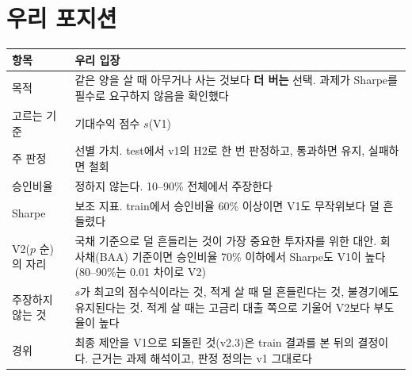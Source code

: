 \section{우리 포지션}
\begin{table}[H]\centering\small
\begin{tabularx}{\linewidth}{@{}p{30mm}L@{}}\toprule
항목 & 우리 입장\\\midrule
목적 & 같은 양을 살 때 아무거나 사는 것보다 \textbf{더 버는} 선택. 과제가 Sharpe를 필수로 요구하지 않음을 확인했다\\
고르는 기준 & 기대수익 점수 $s$(V1)\\
주 판정 & 선별 가치. test에서 v1의 H2로 한 번 판정하고, 통과하면 유지, 실패하면 철회\\
승인비율 & 정하지 않는다. 10--90\% 전체에서 주장한다\\
Sharpe & 보조 지표. train에서 승인비율 60\% 이상이면 V1도 무작위보다 덜 흔들렸다\\
V2($p$ 순)의 자리 & 국채 기준으로 덜 흔들리는 것이 가장 중요한 투자자를 위한 대안. 회사채(BAA) 기준이면 승인비율 70\% 이하에서 Sharpe도 V1이 높다(80--90\%는 0.01 차이로 V2)\\
주장하지 않는 것 & $s$가 최고의 점수식이라는 것, 적게 살 때 덜 흔들린다는 것, 불경기에도 유지된다는 것. 적게 살 때는 고금리 대출 쪽으로 기울어 V2보다 부도율이 높다\\
경위 & 최종 제안을 V1으로 되돌린 것(v2.3)은 train 결과를 본 뒤의 결정이다. 근거는 과제 해석이고, 판정 정의는 v1 그대로다\\\bottomrule
\end{tabularx}
\end{table}

